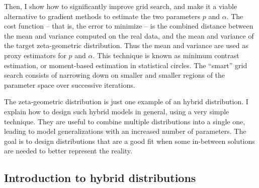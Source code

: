 \documentclass[oneside,10pt]{book}
\begin{document}
Then, I show how to significantly improve grid search, and make it a viable alternative
 to gradient methods to estimate the two parameters $p$ and $\alpha$. The cost function -- that is, the error to minimize -- is the
 combined distance between the mean and variance computed on the real data, and the mean and variance of the target
 zeta-geometric distribution. Thus the mean and variance are used as proxy estimators for $p$ and $\alpha$. This technique
 is known as minimum contrast estimation, or moment-based estimation in statistical circles. The ``smart'' grid search consists
 of narrowing down on smaller and smaller regions of the parameter space over successive iterations.

The zeta-geometric distribution is just one example of an hybrid distribution. I explain how to design such hybrid models in general, using a very simple technique. They are useful to combine multiple distributions into a single one, leading to model generalizations with an increased number of parameters. The goal is to design distributions that are a good fit when some in-between solutions are needed to better represent the reality.




\subsection{Introduction to hybrid distributions}\label{dk6fb}
\end{document}
